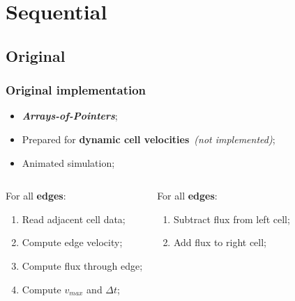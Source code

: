 \section{Sequential}


\subsection{Original}
\begin{frame}
	\frametitle{Original implementation}
	\begin{itemize}
		\item \textbf{\itshape Arrays-of-Pointers};
		\item Prepared for \textbf{dynamic cell velocities}\ \textit{(not implemented)};
		\item Animated simulation;
	\end{itemize}

	\begin{columns}
		\begin{block}{\computeflux}
			\smaller
			For all \textbf{edges}:
			\begin{enumerate}
				\item Read adjacent cell data;	
				\item Compute edge velocity;
				\item Compute flux through edge;
				\item Compute $v_{max}$ and $\Delta t$;
			\end{enumerate}
		\end{block}

		\begin{block}{\update}
			\smaller
			For all \textbf{edges}:
			\begin{enumerate}
				\item Subtract flux from left cell;
				\item Add flux to right cell;
			\end{enumerate}
		\end{block}
	\end{columns}
\end{frame}

